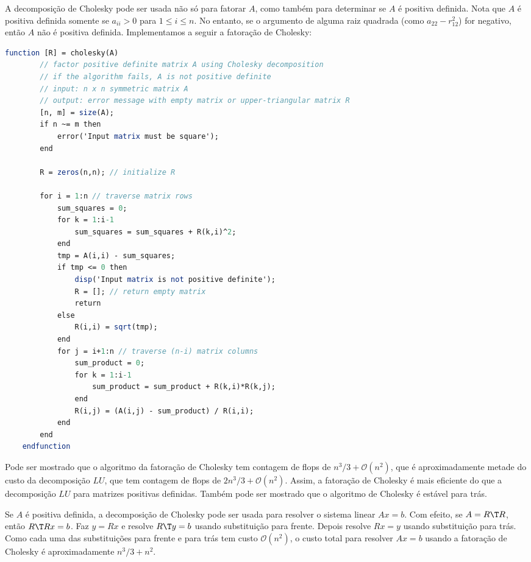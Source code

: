 \documentclass{article}
\begin{document}
A decomposição de Cholesky pode ser usada não só para fatorar \(A\), como também para determinar se \(A\) é positiva definida. Nota que \(A\) é positiva definida somente se \(a_{ii} > 0\) para \(1 \leq i \leq n\). No entanto, se o argumento de alguma raiz quadrada (como \(a_{22} - r_{12}^2\)) for negativo, então \(A\) não é positiva definida. Implementamos a seguir a fatoração de Cholesky:

\begin{lstlisting}[language=Scilab, caption=Fatoração de Cholesky]
    function [R] = cholesky(A)
        // factor positive definite matrix A using Cholesky decomposition
        // if the algorithm fails, A is not positive definite
        // input: n x n symmetric matrix A
        // output: error message with empty matrix or upper-triangular matrix R
        [n, m] = size(A);
        if n ~= m then
            error('Input matrix must be square');
        end
        
        R = zeros(n,n); // initialize R
        
        for i = 1:n // traverse matrix rows
            sum_squares = 0;
            for k = 1:i-1
                sum_squares = sum_squares + R(k,i)^2;
            end
            tmp = A(i,i) - sum_squares;
            if tmp <= 0 then
                disp('Input matrix is not positive definite');
                R = []; // return empty matrix
                return
            else
                R(i,i) = sqrt(tmp);
            end
            for j = i+1:n // traverse (n-i) matrix columns
                sum_product = 0;
                for k = 1:i-1
                    sum_product = sum_product + R(k,i)*R(k,j);
                end
                R(i,j) = (A(i,j) - sum_product) / R(i,i);
            end
        end
    endfunction
\end{lstlisting}

Pode ser mostrado que o algoritmo da fatoração de Cholesky tem contagem de flops de \(n^3/3 + \mathcal{O}(n^2)\), que é aproximadamente metade do custo da decomposição \(LU\), que tem contagem de flops de \(2n^3/3 + \mathcal{O}(n^2)\). Assim, a fatoração de Cholesky é mais eficiente do que a decomposição \(LU\) para matrizes positivas definidas. Também pode ser mostrado que o algoritmo de Cholesky é estável para trás.

Se \(A\) é positiva definida, a decomposição de Cholesky pode ser usada para resolver o sistema linear \(Ax=b\). Com efeito, se \(A=R\T  R\), então \(R\T  R x = b\). Faz \(y = R x\) e resolve \(R\T  y = b\) usando substituição para frente. Depois resolve \(R x = y\) usando substituição para trás. Como cada uma das substituições para frente e para trás tem custo \(\mathcal{O}(n^2)\), o custo total para resolver \(Ax=b\) usando a fatoração de Cholesky é aproximadamente \(n^3/3 + n^2\).
\end{document}
